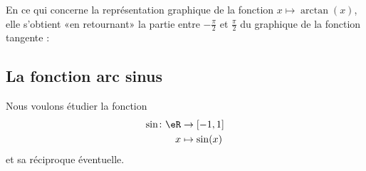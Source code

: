 	En ce qui concerne la représentation graphique de la fonction \( x\mapsto\arctan(x)\), elle s'obtient «en retournant» la partie entre \( -\frac{ \pi }{2}\) et \( \frac{ \pi }{ 2 }\) du graphique de la fonction tangente :
	\begin{center}
		
	\end{center}

	\subsection{La fonction arc sinus}

	Nous voulons étudier la fonction
	\begin{equation}
		\begin{aligned}
			\sin\colon \eR & \to \mathopen[ -1 , 1 \mathclose] \\
			x              & \mapsto \sin(x)
		\end{aligned}
	\end{equation}
	et sa réciproque éventuelle.

